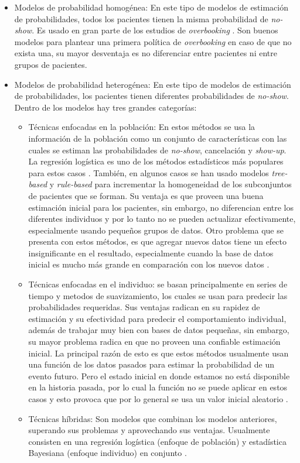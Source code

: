 \begin{itemize}
  \item Modelos de probabilidad homogénea: En este tipo de modelos de estimación de probabilidades, todos los pacientes tienen la misma probabilidad de \textit{no-show}. Es usado en gran parte de los estudios de \textit{overbooking} \cite{berg2013, zeng2010}. Son buenos modelos para plantear una primera política de \textit{overbooking} en caso de que no exista una, su mayor desventaja es no diferenciar entre pacientes ni entre grupos de pacientes.
  \item Modelos de probabilidad heterogénea: En este tipo de modelos de estimación de probabilidades, los pacientes tienen diferentes probabilidades de \textit{no-show}. Dentro de los modelos hay tres grandes categorías:
    \begin{itemize}
      \item Técnicas enfocadas en la población: En estos métodos se usa la información de la población como un conjunto de características con las cuales se estiman las probabilidades de \textit{no-show}, cancelación y \textit{show-up}. La regresión logística es uno de los métodos estadísticos más populares para estos casos  \cite{daggy2010,goldman1982}. También, en algunos casos se han usado modelos \textit{tree-based} y \textit{rule-based} para incrementar la homogeneidad de los subconjuntos de pacientes que se forman. Su ventaja es que proveen una buena estimación inicial para los pacientes, sin embargo, no diferencian entre los diferentes individuos y por lo tanto no se pueden actualizar efectivamente, especialmente usando pequeños grupos de datos. Otro problema que se presenta con estos métodos, es que agregar nuevos datos tiene un efecto insignificante en el resultado, especialmente cuando la base de datos inicial es mucho más grande en comparación con los nuevos datos \cite{alaeddini2015}.
      \item Técnicas enfocadas en el individuo: se basan principalmente en series de tiempo y metodos de suavizamiento, los cuales se usan para predecir las probabilidades requeridas. Sus ventajas radican en su rapidez de estimación y su efectividad para predecir el comportamiento individual, además de trabajar muy bien con bases de datos pequeñas,  sin embargo, su mayor problema radica en que no proveen una confiable estimación inicial. La principal razón de esto es que estos métodos usualmente usan una función de los datos pasados para estimar la probabilidad de un evento futuro. Pero el estado inicial en donde estamos no está disponible en la historia pasada, por lo cual la función no se puede aplicar en estos casos y esto provoca que por lo general se usa un valor inicial aleatorio \cite{alaeddini2015}.
      \item Técnicas híbridas: Son modelos que combinan los modelos anteriores, superando sus problemas y aprovechando sus ventajas. Usualmente consisten en una  regresión logística (enfoque de población)  y  estadística Bayesiana (enfoque individuo) en conjunto \cite{alaeddini2015}.
    \end{itemize}
\end{itemize}
